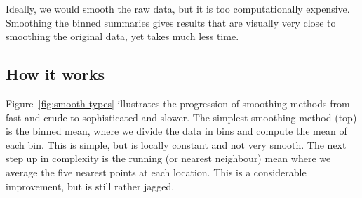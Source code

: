 \documentclass[journal]{vgtc}                %
\begin{document}
Ideally, we would smooth the raw data, but it is too computationally expensive.  Smoothing the binned summaries gives results that are visually very close to smoothing the original data, yet takes much less time.

\subsection{How it works}

Figure~\ref{fig:smooth-types} illustrates the progression of smoothing methods from fast and crude to sophisticated and slower. The simplest smoothing method (top) is the binned mean, where we divide the data in bins and compute the mean of each bin. This is simple, but is locally constant and not very smooth. The next step up in complexity is the running (or nearest neighbour) mean where we average the five nearest points at each location. This is a considerable improvement, but is still rather jagged.
\end{document}
